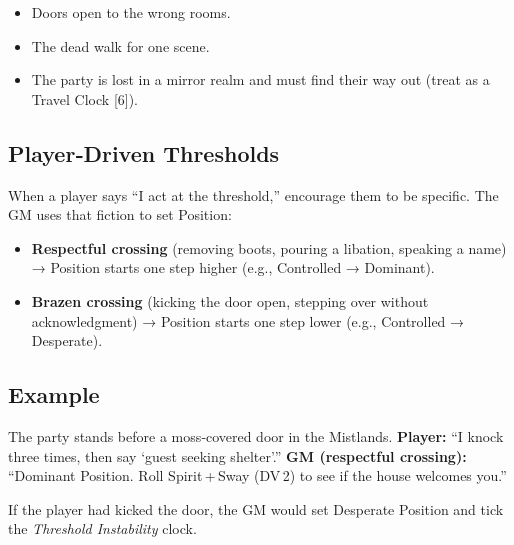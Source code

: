 \begin{itemize}
  \item Doors open to the wrong rooms.
  \item The dead walk for one scene.
  \item The party is lost in a mirror realm and must find their way out (treat as a Travel Clock [6]).
\end{itemize}

\subsection*{Player‑Driven Thresholds}
When a player says “I act at the threshold,” encourage them to be specific. The GM uses that fiction to set Position:

\begin{itemize}
  \item \textbf{Respectful crossing} (removing boots, pouring a libation, speaking a name) → Position starts one step higher (e.g., Controlled → Dominant).
  \item \textbf{Brazen crossing} (kicking the door open, stepping over without acknowledgment) → Position starts one step lower (e.g., Controlled → Desperate).
\end{itemize}

\subsection*{Example}
The party stands before a moss‑covered door in the Mistlands.  
\textbf{Player:} “I knock three times, then say ‘guest seeking shelter’.”  
\textbf{GM (respectful crossing):} “Dominant Position. Roll Spirit + Sway (DV 2) to see if the house welcomes you.”  

If the player had kicked the door, the GM would set Desperate Position and tick the \emph{Threshold Instability} clock.